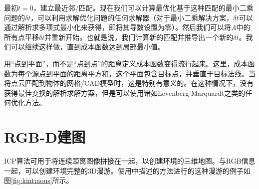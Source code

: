 
最初$t=0$，建立最近邻/匹配。现在我们可以计算最优化基于这种匹配的最小二乘问题的$\delta t$，可以利用求解优化问题的任何求解器（对于最小二乘解决方案，$\delta t$可以通过解析求多项式最小化来获得，即将其导数设置为零）。然后我们可以将$A$中的所有点平移$\delta t$并重新开始。也就是说，我们计算新的匹配并推导出一个新的$\delta t$。我们可以继续这样做，直到成本函数达到局部最小值。


用“点到平面”，而不是“点到点”的距离定义成本函数变得流行起来。这里，成本函数为每个源点到平面的距离平方和，这个平面包含目标点，并垂直于目标法线。当将点云匹配到物体的网格/CAD模型时，这是特别有意义的。在这种情况下，没有获得最佳变换的解析求解方案，但是可以使用诸如Levenberg-Marquardt之类的任何优化方法。


\section{RGB-D建图}
ICP算法可用于将连续距离图像拼接在一起，以创建环境的三维地图\cite{henry2010rgb}。与RGB信息一起，可以创建环境完整的3D漫游。使用\cite{whelan2013robust}中描述的方法进行的这种漫游的例子如图\ref{fig:kintinous}所示。

